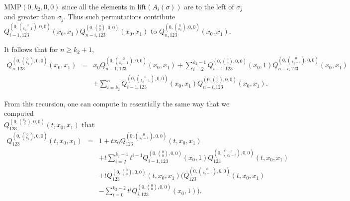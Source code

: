 \documentclass[
final,nomarks
]{dmtcs-episciences}
\newcommand{\lift}{\mathrm{lift}}
\newcommand{\Qmz}[2]{Q_{123}^{(0,\binom{#1}{#2},0,0)}(t,x_0,x_1)}
\newcommand{\Qmzn}[3]{Q_{#3,123}^{(0,\binom{#1}{#2},0,0)}(x_0,x_1)}
\newcommand{\Qmznx}[4]{Q_{#3,123}^{(0,\binom{#1}{#2},0,0)}(#4)}
\newcommand{\MMP}{\mathrm{MMP}}
\begin{document}
\begin{enumerate}[{\bf Case }\bf 1.]
	\begin{math}\MMP(0,k_2,0,0)\end{math} since all the elements in \begin{math}\lift(A_i(\sigma))\end{math} are to the left of \begin{math}\sigma_j\end{math} 
	and greater than \begin{math}\sigma_j\end{math}. Thus such permutations 
	contribute \begin{math}\Qmzn{0}{k_2-1}{i-1}\Qmzn{0}{0}{n-i}\end{math} to \begin{math}\Qmzn{0}{k_2}{n}\end{math}.
	
\end{enumerate}

It follows that for \begin{math}n \geq k_2+1\end{math}, 
\begin{eqnarray}
	\Qmzn{0}{k_2}{n}&=&x_0 \Qmzn{0}{k_2-1}{n-1}+\sum_{i=2}^{k_2-1}\Qmznx{0}{0}{i-1}{x_0,1}\Qmzn{0}{k_2-i}{n-i}\nonumber\\
	&&+\sum_{i=k_2}^{n}\Qmzn{0}{k_2-1}{i-1}\Qmzn{0}{0}{n-i}. 
\end{eqnarray}

From this recursion, one can compute in essentially the same way that we computed \\
\begin{math}\Qmz{k_1}{0}\end{math} that 
\begin{eqnarray}
	\Qmz{0}{k_2}&=&1+t x_0 \Qmz{0}{k_2-1}\nonumber\\\nonumber
	&&+t \sum_{i=2}^{k_2-1}t^{i-1} \Qmznx{0}{0}{i-1}{x_0,1}\Qmz{0}{k_2-i}\\\nonumber
	&&+t \Qmz{0}{0} (\Qmz{0}{k_2-1}\\
	&&-\sum_{i=0}^{k_2-2}t^i \Qmznx{0}{0}{i}{x_0,1}). 
\end{eqnarray}
\end{document}
